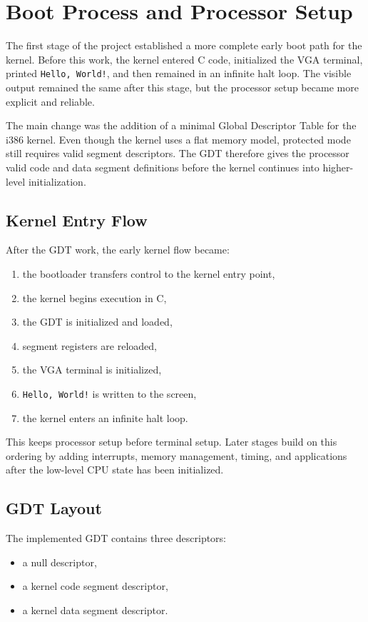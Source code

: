 \section{Boot Process and Processor Setup}

The first stage of the project established a more complete early boot path for the kernel. Before this work, the kernel entered C code, initialized the VGA terminal, printed \texttt{Hello, World!}, and then remained in an infinite halt loop. The visible output remained the same after this stage, but the processor setup became more explicit and reliable.

The main change was the addition of a minimal Global Descriptor Table for the i386 kernel. Even though the kernel uses a flat memory model, protected mode still requires valid segment descriptors. The GDT therefore gives the processor valid code and data segment definitions before the kernel continues into higher-level initialization.

\subsection{Kernel Entry Flow}
After the GDT work, the early kernel flow became:
\begin{enumerate}
  \item the bootloader transfers control to the kernel entry point,
  \item the kernel begins execution in C,
  \item the GDT is initialized and loaded,
  \item segment registers are reloaded,
  \item the VGA terminal is initialized,
  \item \texttt{Hello, World!} is written to the screen,
  \item the kernel enters an infinite halt loop.
\end{enumerate}

This keeps processor setup before terminal setup. Later stages build on this ordering by adding interrupts, memory management, timing, and applications after the low-level CPU state has been initialized.

\subsection{GDT Layout}
The implemented GDT contains three descriptors:
\begin{itemize}
  \item a null descriptor,
  \item a kernel code segment descriptor,
  \item a kernel data segment descriptor.
\end{itemize}

